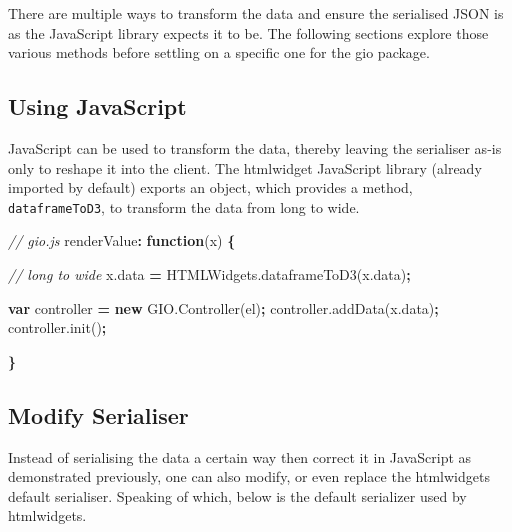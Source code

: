 \documentclass[10pt,]{krantz}
\makeatletter
\newenvironment{Shaded}{\begin{snugshade}}{\end{snugshade}}
\newcommand{\AttributeTok}[1]{\textcolor[rgb]{0.61,0.61,0.61}{#1}}
\newcommand{\CommentTok}[1]{\textcolor[rgb]{0.37,0.37,0.37}{\textit{#1}}}
\newcommand{\KeywordTok}[1]{\textcolor[rgb]{0.27,0.27,0.27}{\textbf{#1}}}
\newcommand{\NormalTok}[1]{#1}
\newcommand{\OperatorTok}[1]{\textcolor[rgb]{0.43,0.43,0.43}{\textbf{#1}}}
\newcommand{\VariableTok}[1]{\textcolor[rgb]{0,0,0}{#1}}
\newenvironment{kframe}{%
\medskip{}
\setlength{\fboxsep}{.8em}
 \def\at@end@of@kframe{}%
 \ifinner\ifhmode%
  \def\at@end@of@kframe{\end{minipage}}%
  \begin{minipage}{\columnwidth}%
 \fi\fi%
 \def\FrameCommand##1{\hskip\@totalleftmargin \hskip-\fboxsep
 \colorbox{shadecolor}{##1}\hskip-\fboxsep
     \hskip-\linewidth \hskip-\@totalleftmargin \hskip\columnwidth}%
 \MakeFramed {\advance\hsize-\width
   \@totalleftmargin\z@ \linewidth\hsize
   \@setminipage}}%
 {\par\unskip\endMakeFramed%
 \at@end@of@kframe}
\renewenvironment{Shaded}{\begin{kframe}}{\end{kframe}}
\makeatother
\begin{document}
There are multiple ways to transform the data and ensure the serialised JSON is as the JavaScript library expects it to be. The following sections explore those various methods before settling on a specific one for the gio package.

\hypertarget{widgets-full-transform-data-js}{%
\subsection{Using JavaScript}\label{widgets-full-transform-data-js}}

JavaScript can be used to transform the data, thereby leaving the serialiser as-is only to reshape it into the client. The htmlwidget JavaScript library (already imported by default) exports an object, which provides a method, \texttt{dataframeToD3}, to transform the data from long to wide.

\begin{Shaded}
\begin{Highlighting}[]
\CommentTok{// gio.js}
\NormalTok{renderValue}\OperatorTok{:} \KeywordTok{function}\NormalTok{(x) }\OperatorTok{\{}

  \CommentTok{// long to wide}
  \VariableTok{x}\NormalTok{.}\AttributeTok{data} \OperatorTok{=} \VariableTok{HTMLWidgets}\NormalTok{.}\AttributeTok{dataframeToD3}\NormalTok{(}\VariableTok{x}\NormalTok{.}\AttributeTok{data}\NormalTok{)}\OperatorTok{;}

  \KeywordTok{var}\NormalTok{ controller }\OperatorTok{=} \KeywordTok{new} \VariableTok{GIO}\NormalTok{.}\AttributeTok{Controller}\NormalTok{(el)}\OperatorTok{;}
  \VariableTok{controller}\NormalTok{.}\AttributeTok{addData}\NormalTok{(}\VariableTok{x}\NormalTok{.}\AttributeTok{data}\NormalTok{)}\OperatorTok{;} 
  \VariableTok{controller}\NormalTok{.}\AttributeTok{init}\NormalTok{()}\OperatorTok{;}

\OperatorTok{\}}
\end{Highlighting}
\end{Shaded}

\hypertarget{widgets-full-transform-data-modify}{%
\subsection{Modify Serialiser}\label{widgets-full-transform-data-modify}}

Instead of serialising the data a certain way then correct it in JavaScript as demonstrated previously, one can also modify, or even replace the htmlwidgets default serialiser. Speaking of which, below is the default serializer used by htmlwidgets.
\end{document}

